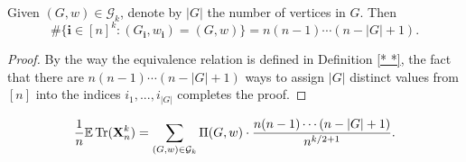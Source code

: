\begin{lemma}
  \label{lem:}
  Given $(G,w) \in \mathcal{G}_k$, denote by $|G|$ the number of vertices in $G$. Then
  \[
  \# \{ \mathbf{i} \in [n]^k : (G_\mathbf{i},w_\mathbf{i}) = (G,w) \} = n (n-1) \cdots (n - |G| + 1).
  \]
\end{lemma}
\begin{proof}
  By the way the equivalence relation is defined in Definition \ref{* *}, 
  the fact that there are $n (n - 1) \cdots (n -|G| + 1)$ ways to assign $|G|$ distinct values from $[n]$ into the indices $i_1,...,i_{|G|}$ completes the proof.
\end{proof}
\begin{lemma}
  \label{lem:}
  \uses{}
  \[
  \frac{1}{n} {\mathbb{E}} \operatorname{Tr} (\mathbf{X}_n^k) = \sum_{(G,w) \in \mathcal{G}_k} \Pi (G,w) \cdot \frac{n (n-1) \cdots (n - |G| + 1)}{n^{k/2+1}}.
  \]
\end{lemma}
